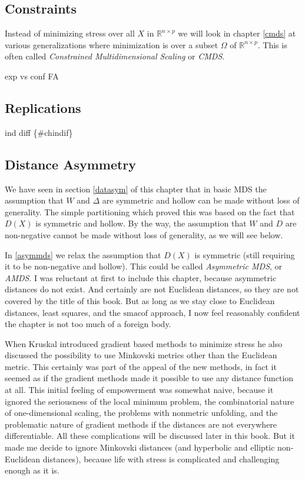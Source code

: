 \documentclass[
  12pt,
]{book}
\theoremstyle{definition}
\theoremstyle{definition}
\theoremstyle{definition}
\theoremstyle{definition}
\theoremstyle{remark}
\begin{document}
\hypertarget{gencons}{%
\subsection{Constraints}\label{gencons}}

Instead of minimizing stress over all \(X\) in
\(\mathbb{R}^{n\times p}\) we will look in chapter \ref{cmds} at various generalizations where minimization is over a subset \(\mathcal{\Omega}\) of
\(\mathbb{R}^{n\times p}\). This is often called \emph{Constrained Multidimensional Scaling} or \emph{CMDS}.

exp vs conf FA

\hypertarget{inreplic}{%
\subsection{Replications}\label{inreplic}}

ind diff \{\#chindif\}

\hypertarget{genasym}{%
\subsection{Distance Asymmetry}\label{genasym}}

We have seen in section \ref{datasym} of this chapter that in basic MDS the assumption that \(W\) and \(\Delta\) are symmetric and hollow can be made without loss of generality. The simple partitioning which proved this was based on the fact that \(D(X)\) is symmetric and hollow. By the way, the assumption that \(W\) and \(D\) are non-negative cannot be made without loss of generality, as we will see below.

In \ref{asymmds} we relax the assumption that \(D(X)\) is symmetric (still requiring it to be non-negative and hollow). This could be called \emph{Asymmetric MDS}, or \emph{AMDS}. I was reluctant at first to include this chapter, because asymmetric distances do not exist. And certainly are not Euclidean distances, so they are not covered by the title of this book. But as long as we stay close to Euclidean distances, least squares, and the \(\textrm{smacof}\) approach, I now feel reasonably confident the chapter is not too much of a foreign body.

When Kruskal introduced gradient based methods to minimize stress he also discussed the possibility to use Minkovski metrics other than the Euclidean metric. This certainly was part of the appeal of the new methods, in fact it seemed as if the gradient methods made it possible to use any distance function at all. This initial feeling of empowerment was somewhat naive, because it ignored the seriousness of the local minimum problem, the combinatorial nature of one-dimensional scaling, the problems with nonmetric unfolding, and the problematic nature of gradient methods if the distances are not everywhere differentiable. All these complications will be discussed later in this book. But it made me decide to ignore Minkovski distances (and hyperbolic and elliptic non-Euclidean distances), because life with stress is complicated and challenging enough as it is.
\end{document}
